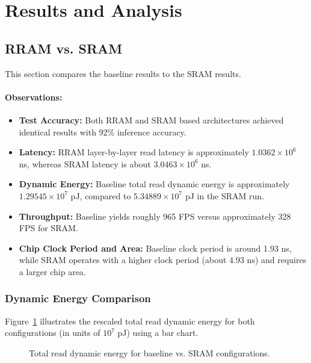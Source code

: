 \documentclass[11pt]{article}
\begin{document}
\section{Results and Analysis}

\subsection{RRAM vs. SRAM}
This section compares the baseline results to the SRAM results.

\paragraph{Observations:}
\begin{itemize}
    \item \textbf{Test Accuracy:} Both RRAM and SRAM based architectures achieved identical results with 92\% inference accuracy.
    \item \textbf{Latency:} RRAM layer-by-layer read latency is approximately $1.0362\times10^6$ ns, whereas SRAM latency is about $3.0463\times10^6$ ns.
    \item \textbf{Dynamic Energy:} Baseline total read dynamic energy is approximately $1.29545\times10^7$ pJ, compared to $5.34889\times10^7$ pJ in the SRAM run.
    \item \textbf{Throughput:} Baseline yields roughly 965 FPS versus approximately 328 FPS for SRAM.
    \item \textbf{Chip Clock Period and Area:} Baseline clock period is around 1.93 ns, while SRAM operates with a higher clock period (about 4.93 ns) and requires a larger chip area.
\end{itemize}

\subsubsection{Dynamic Energy Comparison}
Figure~\ref{fig:baseline_energy_bar} illustrates the rescaled total read dynamic energy for both configurations (in units of $10^7$ pJ) using a bar chart.

\begin{figure}[H]
    \centering
    \caption{Total read dynamic energy for baseline vs. SRAM configurations.}
    \label{fig:baseline_energy_bar}
\end{figure}
\end{document}
